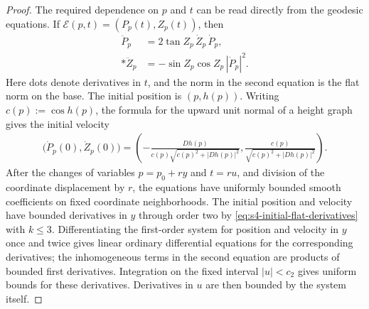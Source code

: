 \documentclass[a4paper,11pt,oneside,reqno]{amsart}
\numberwithin{equation}{section}
\theoremstyle{definition}
\begin{document}
\begin{proof}
    The required dependence on $p$ and $t$ can be read
    directly from the geodesic equations. If
    $\mathcal E(p,t)=(P_p(t),Z_p(t))$, then
    \begin{align*}
        \ddot P_p
            &=2\tan Z_p\,\dot Z_p\,\dot P_p,\\*
        \ddot Z_p
            &=-\sin Z_p\cos Z_p\,|\dot P_p|^2.
    \end{align*}
    Here dots denote derivatives in $t$, and the norm in
    the second equation is the flat norm on the base.
    The initial position is $(p,h(p))$. Writing
    $c(p):=\cos h(p)$, the formula for the upward unit
    normal of a height graph gives the initial velocity
    \begin{align*}
        \bigl(\dot P_p(0),\dot Z_p(0)\bigr)
        =\left(
          -\frac{Dh(p)}{c(p)\sqrt{c(p)^2+|Dh(p)|^2}},
          \frac{c(p)}{\sqrt{c(p)^2+|Dh(p)|^2}}
          \right).
    \end{align*}
    After the changes of variables $p=p_0+ry$ and $t=ru$,
    and division of the coordinate displacement by $r$,
    the equations have uniformly bounded smooth coefficients
    on fixed coordinate neighborhoods. The initial position
    and velocity have bounded derivatives in $y$ through
    order two by \eqref{eq:s4-initial-flat-derivatives}
    with $k\leq3$.
    Differentiating the first-order system for position and
    velocity in $y$ once and twice gives linear ordinary
    differential equations for the corresponding derivatives;
    the inhomogeneous terms in the second equation are
    products of bounded first derivatives. Integration on
    the fixed interval $|u|<c_2$ gives uniform bounds for
    these derivatives. Derivatives in $u$ are then bounded
    by the system itself.


\end{proof}
\end{document}
